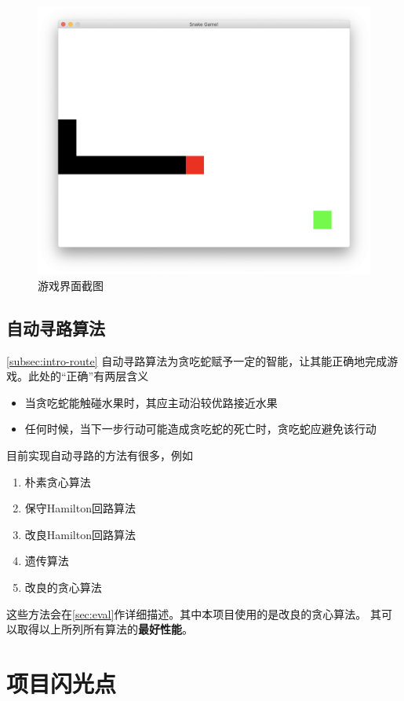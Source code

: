 \documentclass[a4paper]{article}
\begin{document}
\begin{figure}[!hbt]
    \begin{center}
    \includegraphics[scale=0.4]{assets/game.png}
    \caption{游戏界面截图\label{fig:game}} 
    \end{center} 
\end{figure} 

\subsection{自动寻路算法}\autoref{subsec:intro-route}
自动寻路算法为贪吃蛇赋予一定的智能，让其能正确地完成游戏。此处的``正确''有两层含义
\begin{itemize}
    \item 当贪吃蛇能触碰水果时，其应主动沿较优路接近水果
    \item 任何时候，当下一步行动可能造成贪吃蛇的死亡时，贪吃蛇应避免该行动
\end{itemize}
目前实现自动寻路的方法有很多，例如
\begin{enumerate} [label=(\alph*)]
    \item 朴素贪心算法
    \item 保守Hamilton回路算法
    \item 改良Hamilton回路算法
    \item 遗传算法
    \item 改良的贪心算法
\end{enumerate}
这些方法会在\autoref{sec:eval}作详细描述。其中本项目使用的是改良的贪心算法。
其可以取得以上所列所有算法的\textbf{最好性能}。
\section{项目闪光点}
\end{document}
